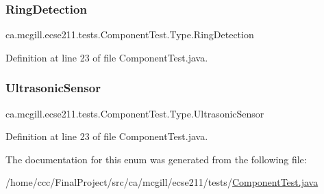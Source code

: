 \subsubsection{\texorpdfstring{Ring\+Detection}{RingDetection}}
{\footnotesize\ttfamily ca.\+mcgill.\+ecse211.\+tests.\+Component\+Test.\+Type.\+Ring\+Detection}



Definition at line 23 of file Component\+Test.\+java.

\mbox{\label{enumca_1_1mcgill_1_1ecse211_1_1tests_1_1_component_test_1_1_type_acb88d74b8bd35b190f8b1b05730c213a}} 
\subsubsection{\texorpdfstring{Ultrasonic\+Sensor}{UltrasonicSensor}}
{\footnotesize\ttfamily ca.\+mcgill.\+ecse211.\+tests.\+Component\+Test.\+Type.\+Ultrasonic\+Sensor}



Definition at line 23 of file Component\+Test.\+java.



The documentation for this enum was generated from the following file\+:\begin{DoxyCompactItemize}
\item 
/home/ccc/\+Final\+Project/src/ca/mcgill/ecse211/tests/\hyperlink{_component_test_8java}{Component\+Test.\+java}\end{DoxyCompactItemize}
